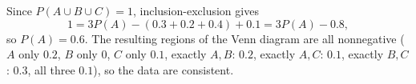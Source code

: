 Since $P(A\cup B\cup C)=1$, inclusion-exclusion gives
\[
1=3P(A)-(0.3+0.2+0.4)+0.1=3P(A)-0.8,
\]
so $P(A)=\boxed{0.6}$. The resulting regions of the Venn diagram are all nonnegative ($A$ only $0.2$, $B$ only $0$, $C$ only $0.1$, exactly $A,B$: $0.2$, exactly $A,C$: $0.1$, exactly $B,C$: $0.3$, all three $0.1$), so the data are consistent.
